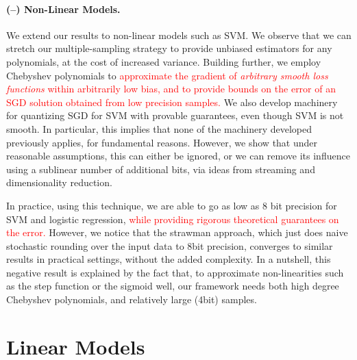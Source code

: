 \documentclass{article}
\begin{document}
\paragraph{(--) Non-Linear Models.} We extend our
results to non-linear models such as SVM. We observe that 
we can stretch our multiple-sampling strategy to provide 
unbiased estimators for any polynomials, at the cost of increased variance. 
Building further, we employ Chebyshev polynomials to   
\textcolor{red}{
approximate the gradient of \emph{arbitrary smooth loss functions} within arbitrarily low bias, 
and to provide bounds on the error of an SGD solution obtained from low precision samples. }
%
%
We also develop machinery for quantizing SGD for SVM with provable guarantees, even though SVM is not smooth.
In particular, this implies that none of the machinery developed previously applies, for fundamental reasons.
However, we show that under reasonable assumptions, this can either be ignored, or we can remove its influence using a sublinear number of additional bits, via ideas from streaming and dimensionality reduction.

In practice, using this technique, we are
able to go as low as 8 bit precision for SVM and logistic regression, \textcolor{red}{while providing 
rigorous theoretical guarantees on the error.} However, we notice that the strawman approach, which just
does naive stochastic rounding over the input data to 8bit precision, converges to similar results in practical settings, 
without the added complexity. 
In a nutshell, this negative result is explained by the fact that, to approximate non-linearities such as the step function or the sigmoid well, our framework needs both high degree Chebyshev polynomials, and relatively large (4bit) samples. 



\vspace{-0.5em}
\section{Linear Models}


%
\end{document}
